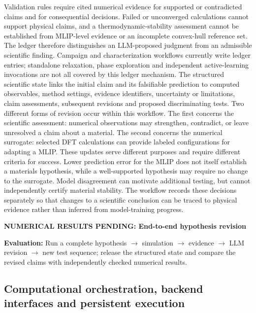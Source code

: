 \documentclass[11pt,a4paper]{article}
\def\ac#1{#1}%
\newcommand{\newexperiment}[2]{\par\medskip\noindent\begingroup\color{red!80!black}\textbf{NUMERICAL RESULTS PENDING: #1}\par\noindent\textbf{Evaluation:} #2\par\endgroup\medskip}
\begin{document}
Validation rules require cited numerical evidence for supported or contradicted claims and for consequential decisions. Failed or unconverged calculations cannot support physical claims, and a thermodynamic-stability assessment cannot be established from MLIP-level evidence or an incomplete convex-hull reference set. The ledger therefore distinguishes an LLM-proposed judgment from an admissible scientific finding. Campaign and characterization workflows currently write ledger entries; standalone relaxation, phase exploration and independent active-learning invocations are not all covered by this ledger mechanism.
The structured scientific state links the initial claim and its falsifiable prediction to computed observables, method settings, evidence identifiers, uncertainty or limitations, claim assessments, subsequent revisions and proposed discriminating tests. Two different forms of revision occur within this workflow. The first concerns the scientific assessment: numerical observations may strengthen, contradict, or leave unresolved a claim about a material. The second concerns the numerical surrogate: selected \ac{DFT} calculations can provide labeled configurations for adapting a \ac{MLIP}. These updates serve different purposes and require different criteria for success. Lower prediction error for the MLIP does not itself establish a materials hypothesis, while a well-supported hypothesis may require no change to the surrogate. Model disagreement can motivate additional testing, but cannot independently certify material stability. The workflow records these decisions separately so that changes to a scientific conclusion can be traced to physical evidence rather than inferred from model-training progress.

\newexperiment{End-to-end hypothesis revision}{Run a complete hypothesis $\rightarrow$ simulation $\rightarrow$ evidence $\rightarrow$ LLM revision $\rightarrow$ new test sequence; release the structured state and compare the revised claims with independently checked numerical results. }

\subsection{Computational orchestration, backend interfaces and persistent execution}
\end{document}
